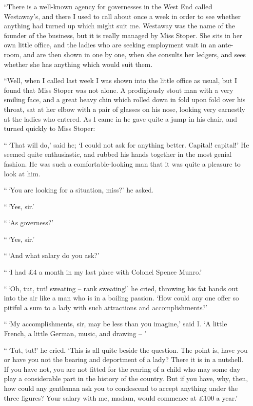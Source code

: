 “There is a well-known agency for governesses in the West
End called Westaway’s, and there I used to call about once a
week in order to see whether anything had turned up which
might suit me. Westaway was the name of the founder of
the business, but it is really managed by Miss Stoper. She
sits in her own little office, and the ladies who are seeking
employment wait in an ante-room, and are then shown in one
by one, when she consults her ledgers, and sees whether she
has anything which would suit them.

“Well, when I called last week I was shown into the little
office as usual, but I found that Miss Stoper was not alone.
A prodigiously stout man with a very smiling face, and a great
heavy chin which rolled down in fold upon fold over his throat,
sat at her elbow with a pair of glasses on his nose, looking
very earnestly at the ladies who entered. As I came in he
gave quite a jump in his chair, and turned quickly to Miss
Stoper:

“\,‘That will do,’ said he; ‘I could not ask for anything
better. Capital! capital!’ He seemed quite enthusiastic, and
rubbed his hands together in the most genial fashion. He
was such a comfortable-looking man that it was quite a pleasure
to look at him.

“\,‘You are looking for a situation, miss?’ he asked.

“\,‘Yes, sir.’

“\,‘As governess?’

“\,‘Yes, sir.’

“\,‘And what salary do you ask?’

“\,‘I had £4 a month in my last place with Colonel Spence
Munro.’

“\,‘Oh, tut, tut! sweating -- rank sweating!’ he cried, throwing
his fat hands out into the air like a man who is in a
boiling passion. ‘How could any one offer so pitiful a sum to
a lady with such attractions and accomplishments?’

“\,‘My accomplishments, sir, may be less than you imagine,’
said I. ‘A little French, a little German, music, and drawing -- ’

“\,‘Tut, tut!’ he cried. ‘This is all quite beside the question.
The point is, have you or have you not the bearing and deportment
of a lady? There it is in a nutshell. If you have
not, you are not fitted for the rearing of a child who may some
day play a considerable part in the history of the country.
But if you have, why, then, how could any gentleman ask you
to condescend to accept anything under the three figures?
Your salary with me, madam, would commence at £100 a
year.’

